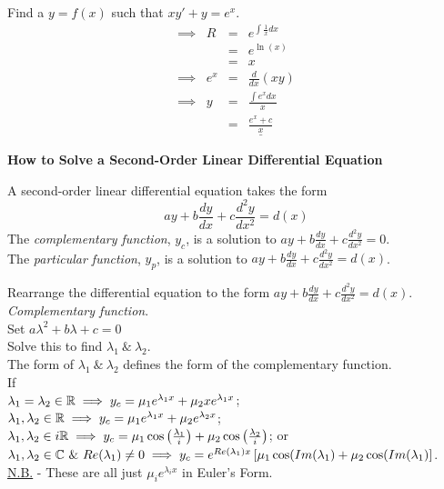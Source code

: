 \documentclass[11pt,a4paper]{article}
\begin{document}
\subtitle{Example}
Find a $y = f(x)$ such that $xy' + y = e^x$.
\[\begin{array}{rrcl}
\implies&R&=&e^{\int\frac{1}{x}dx}\\
&&=&e^{\ln(x)}\\
&&=&x\\
\implies& e^x &=& \frac{d}{dx}(xy)\\
\implies& y &=& \displaystyle{\frac{\int e^x dx}{x}}\\
&&=& \displaystyle{\underline{\frac{e^x + c}{x}}}
\end{array}\]

\textbf{How to Solve a Second-Order Linear Differential Equation}\\

\subtitle{Theory}
A second-order linear differential equation takes the form
$$ay + b\frac{dy}{dx} + c\frac{d^2y}{dx^2} = d(x)$$
The \textit{complementary function}, $y_c$, is a solution to $ay + b\frac{dy}{dx} + c\frac{d^2y}{dx^2} = 0$.\\
The \textit{particular function}, $y_p$, is a solution to $ay + b\frac{dy}{dx} + c\frac{d^2y}{dx^2} = d(x)$.\\

\subtitle{Process}
Rearrange the differential equation to the form $ay + b\frac{dy}{dx} + c\frac{d^2y}{dx^2} = d(x)$.\\

\textit{Complementary function}.\\
Set $a\lambda^2 + b\lambda + c = 0$\\
Solve this to find $\lambda_1\ \&\ \lambda_2$.\\
The form of $\lambda_1\ \&\ \lambda_2$ defines the form of the complementary function.\\
If\\
\-\hspace{4ex}$\lambda_1 = \lambda_2 \in \mathbb{R} \implies y_c = \mu_1 e^{\lambda_1 x} + \mu_2xe^{\lambda_1 x}$;\\
\-\hspace{4ex}$\lambda_1, \lambda_2 \in \mathbb{R} \implies y_c = \mu_1 e^{\lambda_1 x} + \mu_2 e^{\lambda_2 x}$;\\
\-\hspace{4ex}$\lambda_1, \lambda_2 \in i\mathbb{R} \implies y_c = \mu_1 \cos\left(\frac{\lambda_1}{i}\right) + \mu_2 \cos\left(\frac{\lambda_2}{i}\right)$; or\\
\-\hspace{4ex}$\lambda_1, \lambda_2 \in \complex\ \&\ Re(\lambda_1) \neq 0 \implies y_c = e^{Re(\lambda_1)x}\left[\mu_1 \cos(Im(\lambda_1) + \mu_2 \cos(Im(\lambda_1)\right]$.
\underline{N.B.} - These are all just $\mu_i e^{\lambda_i x}$ in Euler's Form.\\
\end{document}
